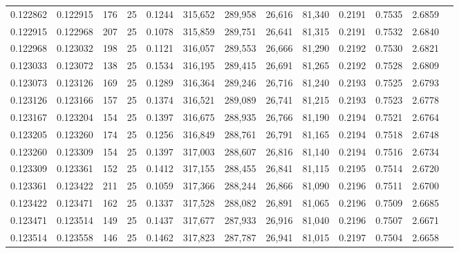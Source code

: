 \begin{tabular}{rrrrrrrrrrrrr}
0.122862 & 0.122915 &   176 &  25 &                                     0.1244 & 315,652 & 289,958 &  26,616 &  81,340 & 0.2191 & 0.7535 & 2.6859 \\
0.122915 & 0.122968 &   207 &  25 &                                     0.1078 & 315,859 & 289,751 &  26,641 &  81,315 & 0.2191 & 0.7532 & 2.6840 \\
0.122968 & 0.123032 &   198 &  25 &                                     0.1121 & 316,057 & 289,553 &  26,666 &  81,290 & 0.2192 & 0.7530 & 2.6821 \\
0.123033 & 0.123072 &   138 &  25 &                                     0.1534 & 316,195 & 289,415 &  26,691 &  81,265 & 0.2192 & 0.7528 & 2.6809 \\
0.123073 & 0.123126 &   169 &  25 &                                     0.1289 & 316,364 & 289,246 &  26,716 &  81,240 & 0.2193 & 0.7525 & 2.6793 \\
0.123126 & 0.123166 &   157 &  25 &                                     0.1374 & 316,521 & 289,089 &  26,741 &  81,215 & 0.2193 & 0.7523 & 2.6778 \\
0.123167 & 0.123204 &   154 &  25 &                                     0.1397 & 316,675 & 288,935 &  26,766 &  81,190 & 0.2194 & 0.7521 & 2.6764 \\
0.123205 & 0.123260 &   174 &  25 &                                     0.1256 & 316,849 & 288,761 &  26,791 &  81,165 & 0.2194 & 0.7518 & 2.6748 \\
0.123260 & 0.123309 &   154 &  25 &                                     0.1397 & 317,003 & 288,607 &  26,816 &  81,140 & 0.2194 & 0.7516 & 2.6734 \\
0.123309 & 0.123361 &   152 &  25 &                                     0.1412 & 317,155 & 288,455 &  26,841 &  81,115 & 0.2195 & 0.7514 & 2.6720 \\
0.123361 & 0.123422 &   211 &  25 &                                     0.1059 & 317,366 & 288,244 &  26,866 &  81,090 & 0.2196 & 0.7511 & 2.6700 \\
0.123422 & 0.123471 &   162 &  25 &                                     0.1337 & 317,528 & 288,082 &  26,891 &  81,065 & 0.2196 & 0.7509 & 2.6685 \\
0.123471 & 0.123514 &   149 &  25 &                                     0.1437 & 317,677 & 287,933 &  26,916 &  81,040 & 0.2196 & 0.7507 & 2.6671 \\
0.123514 & 0.123558 &   146 &  25 &                                     0.1462 & 317,823 & 287,787 &  26,941 &  81,015 & 0.2197 & 0.7504 & 2.6658 \\

\end{tabular}
